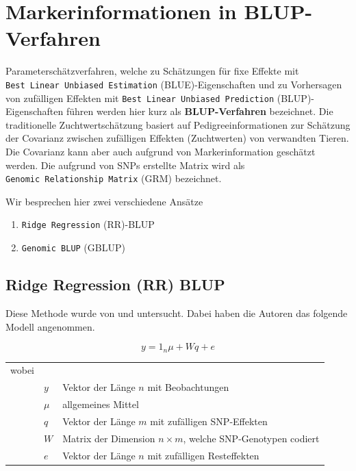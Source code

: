 \documentclass[]{book}
\providecommand{\tightlist}{%
  \setlength{\itemsep}{0pt}\setlength{\parskip}{0pt}}
\begin{document}
\section{Markerinformationen in
BLUP-Verfahren}\label{markerinformationen-in-blup-verfahren}

Parameterschätzverfahren, welche zu Schätzungen für fixe Effekte mit
\texttt{Best\ Linear\ Unbiased\ Estimation} (BLUE)-Eigenschaften und zu
Vorhersagen von zufälligen Effekten mit
\texttt{Best\ Linear\ Unbiased\ Prediction} (BLUP)-Eigenschaften führen
werden hier kurz als \textbf{BLUP-Verfahren} bezeichnet. Die
traditionelle Zuchtwertschätzung basiert auf Pedigreeinformationen zur
Schätzung der Covarianz zwischen zufälligen Effekten (Zuchtwerten) von
verwandten Tieren. Die Covarianz kann aber auch aufgrund von
Markerinformation geschätzt werden. Die aufgrund von SNPs erstellte
Matrix wird als \texttt{Genomic\ Relationship\ Matrix} (GRM) bezeichnet.

Wir besprechen hier zwei verschiedene Ansätze

\begin{enumerate}
\def\labelenumi{\arabic{enumi}.}
\tightlist
\item
  \texttt{Ridge\ Regression} (RR)-BLUP
\item
  \texttt{Genomic\ BLUP} (GBLUP)
\end{enumerate}

\subsection{Ridge Regression (RR) BLUP}\label{ridge-regression-rr-blup}

Diese Methode wurde von \citep{MHG2001} und \citep{HFD2007} untersucht.
Dabei haben die Autoren das folgende Modell angenommen.

\begin{equation}
y = 1_n\mu + Wq + e
\label{eq:RRBlupModel}
\end{equation}

\begin{tabular}{lll}
wobei  &         & \\
       &  $y$    &  Vektor der Länge $n$ mit Beobachtungen \\
       &  $\mu$  &  allgemeines Mittel \\
       &  $q$    &  Vektor der Länge $m$ mit zufälligen SNP-Effekten\\
       &  $W$    &  Matrix der Dimension $n\times m$, welche SNP-Genotypen codiert\\
       &  $e$    &  Vektor der Länge $n$ mit zufälligen Resteffekten
\end{tabular}
\end{document}
